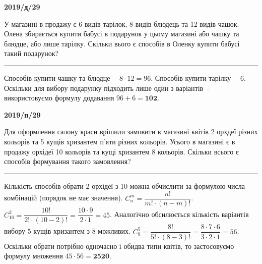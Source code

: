 \documentclass[12pt,a4paper]{article}  %
\begin{document}
\vspace{20pt}
\par\medskip \textbf{2019/д/29}\par
У магазині в продажу є 6 видів тарілок, 8 видів блюдець та 12 видів чашок. Олена збирається купити бабусі в подарунок у цьому магазині або чашку та блюдце, або лише тарілку. Скільки вього є способів в Оленку купити бабусі такий подарунок?

\noindent\rule[0.5ex]{\linewidth}{1pt}
Способів купити чашку та блюдце~-- $8\cdot12=96$. Способів купити тарілку~-- $6$. Оскільки для вибору подарунку підходить лише один з варіантів~-- використовуємо формулу додавання $96+6=\textbf{102}$.

\vspace{20pt}
\par\medskip \textbf{2019/п/29}\par
Для оформлення салону краси врішили замовити в магазині квітів 2 орхдеї різних кольорів та 5 кущів хризантем п'яти різних кольорів. Усього в магазині є в продажу орхідеї 10 кольорів та кущі хризантем 8 кольорів. Скільки всього є способів формування такого замовлення?

\noindent\rule[0.5ex]{\linewidth}{1pt}
Кількість способів обрати 2 орхідеї з 10 можна обчислити за формулою числа комбінацій (порядок не має значення).
$C_n^m=\dfrac{n!}{m!\cdot(n-m)!}$.
$C_{10}^2=\dfrac{10!}{2!\cdot(10-2)!}=\dfrac{10\cdot9}{2\cdot1}=45$.
Аналогічно обсилюється кількість варіантів вибору 5 кущів хризантем з 8 можливих.
$C_{8}^5=\dfrac{8!}{5!\cdot(8-3)!}=\dfrac{8\cdot7\cdot6}{3\cdot2\cdot1}=56$.
Оскільки обрати потрібно одночасно і обидва типи квітів, то застосовуємо формулу множення $45\cdot56=\textbf{2520}$.
\end{document}
